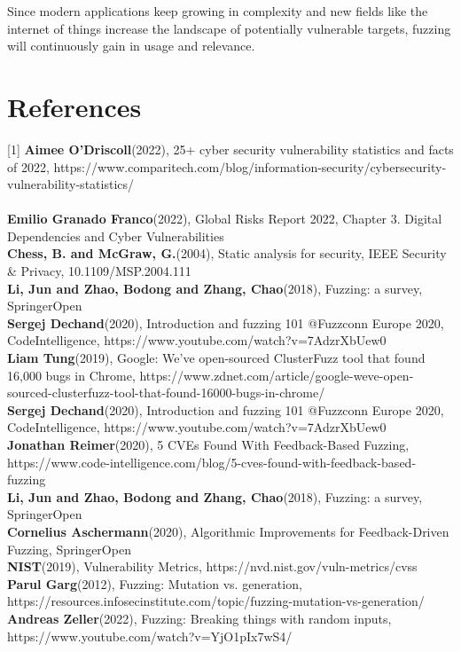 \documentclass[journal=tosc,final]{iacrtrans}
\begin{document}
Since modern applications keep growing in complexity and new fields like the internet of things increase the landscape of potentially vulnerable targets, fuzzing will continuously gain in usage and relevance.
\section{References}
[1] \textbf{Aimee O'Driscoll}(2022), 25+ cyber security vulnerability statistics and facts of 2022, https://www.comparitech.com/blog/information-security/cybersecurity-vulnerability-statistics/\\
\\
\noindent[2] \textbf{Emilio Granado Franco}(2022),  Global Risks Report 2022, Chapter 3. Digital Dependencies and Cyber Vulnerabilities\\

\noindent[3] \textbf{Chess, B. and McGraw, G.}(2004), Static analysis for security, IEEE Security \& Privacy, 10.1109/MSP.2004.111
\\


\noindent[4] \textbf{Li, Jun and Zhao, Bodong and Zhang, Chao}(2018),     Fuzzing: a survey, SpringerOpen
\\

\noindent [5] \textbf{Sergej Dechand}(2020), Introduction and fuzzing 101 @Fuzzconn Europe 2020, CodeIntelligence, https://www.youtube.com/watch?v=7AdzrXbUew0
\\

\noindent [6] \textbf{Liam Tung}(2019),  Google: We've open-sourced ClusterFuzz tool that found 16,000 bugs in Chrome, https://www.zdnet.com/article/google-weve-open-sourced-clusterfuzz-tool-that-found-16000-bugs-in-chrome/
\\

\noindent [7] \textbf{Sergej Dechand}(2020), Introduction and fuzzing 101 @Fuzzconn Europe 2020, CodeIntelligence, https://www.youtube.com/watch?v=7AdzrXbUew0
\\

\noindent[8] \textbf{Jonathan Reimer}(2020), 5 CVEs Found With Feedback-Based Fuzzing, https://www.code-intelligence.com/blog/5-cves-found-with-feedback-based-fuzzing
\\

\noindent[9] \textbf{Li, Jun and Zhao, Bodong and Zhang, Chao}(2018),     Fuzzing: a survey, SpringerOpen
\\


\noindent[10] \textbf{Cornelius Aschermann}(2020), Algorithmic Improvements for
Feedback-Driven Fuzzing, SpringerOpen
\\

\noindent[11] \textbf{NIST}(2019), Vulnerability Metrics, https://nvd.nist.gov/vuln-metrics/cvss
\\

\noindent[12] \textbf{Parul Garg}(2012), Fuzzing: Mutation vs. generation, https://resources.infosecinstitute.com/topic/fuzzing-mutation-vs-generation/
\\

\noindent[13] \textbf{Andreas Zeller}(2022), Fuzzing: Breaking things with random inputs, https://www.youtube.com/watch?v=YjO1pIx7wS4/
\\
\end{document}
